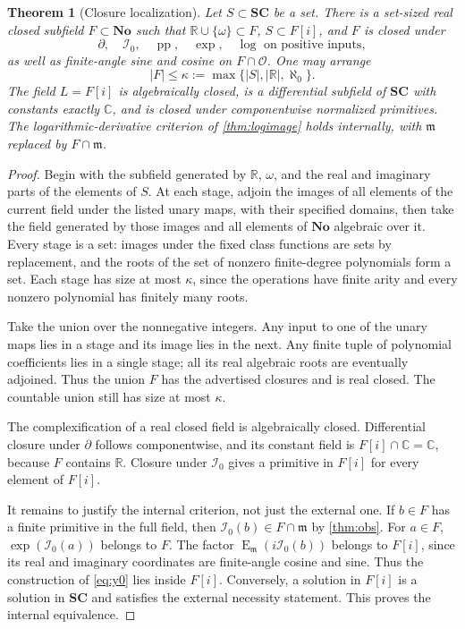 \documentclass[11pt,letterpaper]{article}
\numberwithin{equation}{section}
\newtheorem{theorem}{Theorem}[section]
\theoremstyle{definition}
\theoremstyle{remark}
\newcommand{\No}{\mathbf{No}}
\newcommand{\SC}{\mathbf{SC}}
\newcommand{\R}{\mathbb R}
\newcommand{\C}{\mathbb C}
\newcommand{\OO}{\mathcal O}
\newcommand{\mm}{\mathfrak m}
\newcommand{\der}{\partial}
\newcommand{\pp}{\operatorname{pp}}
\newcommand{\Em}{\operatorname{E}_{\mm}}
\newcommand{\Izero}{\mathcal I_0}
\begin{document}
\begin{theorem}[Closure localization]\label{thm:localize}
Let $S\subset\SC$ be a set. There is a set-sized real closed subfield $F\subset\No$ such that $\R\cup\{\omega\}\subset F$, $S\subset F[i]$, and $F$ is closed under
\[
 \der,\quad\Izero,\quad\pp,\quad\exp,\quad
 \log\text{ on positive inputs},
\]
as well as finite-angle sine and cosine on $F\cap\OO$. One may arrange
\[
 |F|\leq\kappa:=\max\{|S|,|\R|,\aleph_0\}.
\]
The field $L=F[i]$ is algebraically closed, is a differential subfield of $\SC$ with constants exactly $\C$, and is closed under componentwise normalized primitives. The logarithmic-derivative criterion of \cref{thm:logimage} holds internally, with $\mm$ replaced by $F\cap\mm$.
\end{theorem}
\begin{proof}
Begin with the subfield generated by $\R$, $\omega$, and the real and imaginary parts of the elements of $S$. At each stage, adjoin the images of all elements of the current field under the listed unary maps, with their specified domains, then take the field generated by those images and all elements of $\No$ algebraic over it. Every stage is a set: images under the fixed class functions are sets by replacement, and the roots of the set of nonzero finite-degree polynomials form a set. Each stage has size at most $\kappa$, since the operations have finite arity and every nonzero polynomial has finitely many roots.

Take the union over the nonnegative integers. Any input to one of the unary maps lies in a stage and its image lies in the next. Any finite tuple of polynomial coefficients lies in a single stage; all its real algebraic roots are eventually adjoined. Thus the union $F$ has the advertised closures and is real closed. The countable union still has size at most $\kappa$.

The complexification of a real closed field is algebraically closed. Differential closure under $\der$ follows componentwise, and its constant field is $F[i]\cap\C=\C$, because $F$ contains $\R$. Closure under $\Izero$ gives a primitive in $F[i]$ for every element of $F[i]$.

It remains to justify the internal criterion, not just the external one. If $b\in F$ has a finite primitive in the full field, then $\Izero(b)\in F\cap\mm$ by \cref{thm:obs}. For $a\in F$, $\exp(\Izero(a))$ belongs to $F$. The factor $\Em(i\Izero(b))$ belongs to $F[i]$, since its real and imaginary coordinates are finite-angle cosine and sine. Thus the construction of \eqref{eq:y0} lies inside $F[i]$. Conversely, a solution in $F[i]$ is a solution in $\SC$ and satisfies the external necessity statement. This proves the internal equivalence.
\end{proof}
\end{document}
